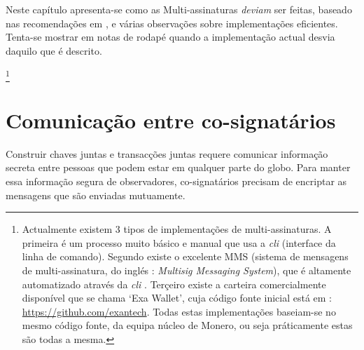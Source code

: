 Neste capítulo apresenta-se como as Multi-assinaturas {\em deviam} ser feitas, baseado nas recomendações em \cite{MRL-0009-multisig}, e várias observações sobre implementações eficientes. Tenta-se mostrar em notas de rodapé quando a implementação actual desvia daquilo que é descrito. 

\footnote{Actualmente existem 3 tipos de implementações de multi-assinaturas. A primeira é um processo muito básico e manual que usa a {\em cli} (interface da linha de comando)\cite{cli-22multisig-instructions}. Segundo existe o excelente MMS (sistema de mensagens de multi-assinatura, do inglés : {\em Multisig Messaging System}), que é altamente automatizado através da {\em cli} \cite{mms-manual, mms-project-proposal}. Terçeiro existe a carteira comercialmente disponível que se chama `Exa Wallet', cuja código fonte inicial está em : \url{https://github.com/exantech}. Todas estas implementações baseiam-se no mesmo código fonte, da equipa núcleo de Monero, ou seja práticamente estas são todas a mesma.}  


\section{Comunicação entre co-signatários}
\label{sec:communicating}

Construir chaves juntas e transacções juntas requere comunicar informação secreta entre pessoas que podem estar em qualquer parte do globo. Para manter essa informação segura de observadores, co-signatários precisam de encriptar as mensagens que são enviadas mutuamente. 

